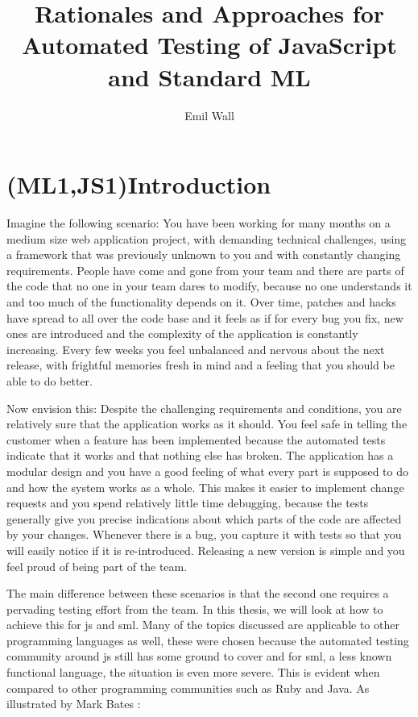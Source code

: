 \documentclass[11pt]{article}
\title{Rationales and Approaches for Automated Testing of JavaScript and Standard ML}
\author{Emil Wall}
\begin{document}
%
\tableofcontents %

\printglossaries

\section{(ML1,JS1)Introduction}

Imagine the following scenario: You have been working for many months on a medium size web application project, with demanding technical challenges, using a framework that was previously unknown to you and with constantly changing requirements. People have come and gone from your team and there are parts of the code that no one in your team dares to modify, because no one understands it and too much of the functionality depends on it. Over time, patches and hacks have spread to all over the code base and it feels as if for every bug you fix, new ones are introduced and the complexity of the application is constantly increasing. Every few weeks you feel unbalanced and nervous about the next release, with frightful memories fresh in mind and a feeling that you should be able to do better.

Now envision this: Despite the challenging requirements and conditions, you are relatively sure that the application works as it should. You feel safe in telling the customer when a feature has been implemented because the automated tests indicate that it works and that nothing else has broken. The application has a modular design and you have a good feeling of what every part is supposed to do and how the system works as a whole. This makes it easier to implement change requests and you spend relatively little time debugging, because the tests generally give you precise indications about which parts of the code are affected by your changes. Whenever there is a bug, you capture it with tests so that you will easily notice if it is re-introduced. Releasing a new version is simple and you feel proud of being part of the team.

The main difference between these scenarios is that the second one requires a pervading testing effort from the team. In this thesis, we will look at how to achieve this for \gls{js} and \gls{sml}. Many of the topics discussed are applicable to other programming languages as well, these were chosen because the automated testing community around \gls{js} still has some ground to cover \cite[p.~xix]{Tddjs} and for \gls{sml}, a less known functional language, the situation is even more severe. This is evident when compared to other programming communities such as Ruby and Java. As illustrated by Mark Bates \cite{TestingStatistics}:
\end{document}
